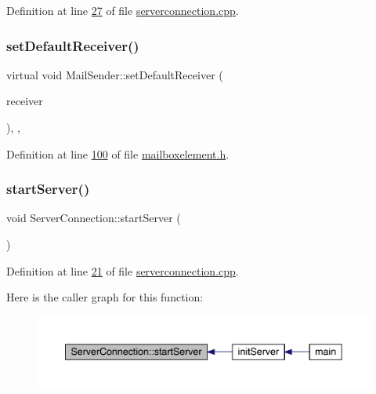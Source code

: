 Definition at line \hyperlink{a00101_source_l00027}{27} of file \hyperlink{a00101_source}{serverconnection.\+cpp}.

\mbox{\label{a00205_aa85db0004c26606c5ac294e5de000b96}} 
\subsubsection{\texorpdfstring{set\+Default\+Receiver()}{setDefaultReceiver()}}
{\footnotesize\ttfamily virtual void Mail\+Sender\+::set\+Default\+Receiver (\begin{DoxyParamCaption}\item[{\hyperlink{a00197}{Mail\+Receiver} $\ast$}]{receiver }\end{DoxyParamCaption})\hspace{0.3cm}{\ttfamily [inline]}, {\ttfamily [virtual]}, {\ttfamily [inherited]}}



Definition at line \hyperlink{a00002_source_l00100}{100} of file \hyperlink{a00002_source}{mailboxelement.\+h}.

\mbox{\label{a00181_a1d45a6a7b2370c82ed2849959bb18c2a}} 
\subsubsection{\texorpdfstring{start\+Server()}{startServer()}}
{\footnotesize\ttfamily void Server\+Connection\+::start\+Server (\begin{DoxyParamCaption}{ }\end{DoxyParamCaption})}



Definition at line \hyperlink{a00101_source_l00021}{21} of file \hyperlink{a00101_source}{serverconnection.\+cpp}.

Here is the caller graph for this function\+:
\nopagebreak
\begin{figure}[H]
\begin{center}
\leavevmode
\includegraphics[width=350pt]{d8/d64/a00181_a1d45a6a7b2370c82ed2849959bb18c2a_icgraph}
\end{center}
\end{figure}


